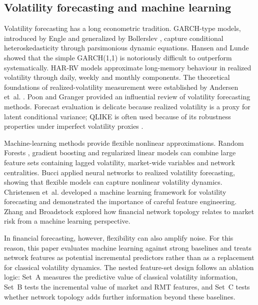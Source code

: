 \subsection{Volatility forecasting and machine learning}

Volatility forecasting has a long econometric tradition. GARCH-type models, introduced by Engle \cite{engle_1982_autoregressive} and generalized by Bollerslev \cite{bollerslev_1986_generalized}, capture conditional heteroskedasticity through parsimonious dynamic equations. Hansen and Lunde \cite{hansen_lunde_2005} showed that the simple GARCH(1,1) is notoriously difficult to outperform systematically. HAR-RV models \cite{corsi_2009_simple} approximate long-memory behaviour in realized volatility through daily, weekly and monthly components. The theoretical foundations of realized-volatility measurement were established by Andersen et~al. \cite{andersen_2003_modeling}. Poon and Granger \cite{poon_granger_2003} provided an influential review of volatility forecasting methods. Forecast evaluation is delicate because realized volatility is a proxy for latent conditional variance; QLIKE is often used because of its robustness properties under imperfect volatility proxies \cite{patton_2011_volatility}.

Machine-learning methods provide flexible nonlinear approximations. Random Forests \cite{breiman_2001_random}, gradient boosting \cite{friedman_2001_greedy} and regularized linear models \cite{hoerl_kennard_1970_ridge} can combine large feature sets containing lagged volatility, market-wide variables and network centralities. Bucci \cite{bucci_2020_realized} applied neural networks to realized volatility forecasting, showing that flexible models can capture nonlinear volatility dynamics. Christensen et~al. \cite{christensen_2022_realized} developed a machine learning framework for volatility forecasting and demonstrated the importance of careful feature engineering. Zhang and Broadstock \cite{zhang_2023_network_volatility} explored how financial network topology relates to market risk from a machine learning perspective.

In financial forecasting, however, flexibility can also amplify noise. For this reason, this paper evaluates machine learning against strong baselines and treats network features as potential incremental predictors rather than as a replacement for classical volatility dynamics. The nested feature-set design follows an ablation logic: Set~A measures the predictive value of classical volatility information, Set~B tests the incremental value of market and RMT features, and Set~C tests whether network topology adds further information beyond these baselines.
